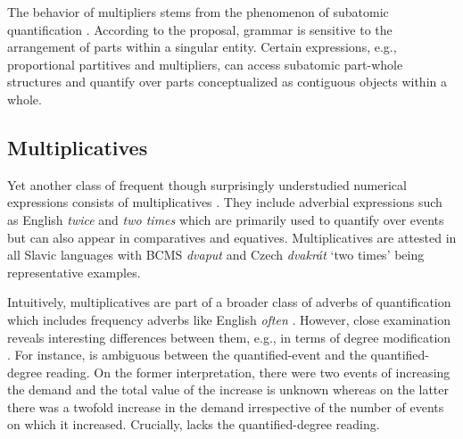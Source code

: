 \documentclass[output=paper]{langscibook}
\begin{document}
				\ea\label{ex:multiplier-bcs} \label{ex:multiplier-bcs-kruna}
	\label{ex:multiplier-bcs-ubistvo}
	\z
	\z
	
	\noindent The behavior of multipliers stems from the phenomenon of subatomic quantification \citep{wagiel2018subatomic}. According to the proposal, grammar is sensitive to the arrangement of parts within a singular entity. Certain expressions, e.g., proportional partitives and multipliers, can access subatomic part-whole structures and quantify over parts conceptualized as contiguous objects within a whole.
	
	\subsection{Multiplicatives}\label{sec:multiplicatives}
 
    Yet another class of frequent though surprisingly understudied numerical expressions consists of multiplicatives \citep[but see][]{landman2006indefinite,donazzan2013oncounting,kayne2015once}. They include adverbial expressions such as English \textit{twice} and \textit{two times} which are primarily used to quantify over events but can also appear in comparatives and equatives. Multiplicatives are attested in all Slavic languages with BCMS \textit{dvaput} and Czech \textit{dvakrát} `two times' being representative examples. 
	
    Intuitively, multiplicatives are part of a broader class of adverbs of quantification which includes frequency adverbs like English \textit{often} \citep{abeille_et-al2004adverbs,doetjes2007adverbs}. However, close examination reveals interesting differences between them, e.g., in terms of degree modification \citep{docekal_wagiel2018event}. For instance,  is ambiguous between the quantified-event and the quanti\-fied-degree reading. On the former interpretation, there were two events of increasing the demand and the total value of the increase is unknown whereas on the latter there was a twofold increase in the demand irrespective of the number of events on which it increased. Crucially,  lacks the quantified-degree reading.
\end{document}
